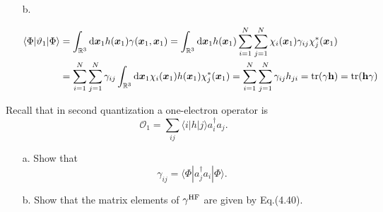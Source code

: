 \documentclass[a4paper]{book}
\newcommand\tr[1]{\mathrm{tr(#1)}}
\newcommand*{\dif}{\mathop{}\!\mathrm{d}}
\newcommand{\HF}{{\rm HF}}
\newcommand{\h}{{\bf h}}
\begin{document}
\begin{solution}
\begin{itemize}
	\item[b.] 
	
	\begin{align*}
		\langle \Phi | \vartheta_1 | \Phi \rangle &= \int_{ \mathbb{R}^3 } \dif \boldsymbol{x}_1 h( \boldsymbol{x}_1 ) \gamma( \boldsymbol{x}_1 , \boldsymbol{x}_1 ) = \int_{ \mathbb{R}^3 } \dif \boldsymbol{x}_1 h( \boldsymbol{x}_1 ) \sum_{ i=1 }^N \sum_{ j=1 }^N \chi_i( \boldsymbol{x}_1 ) \gamma_{ij} \chi^*_j( \boldsymbol{x}_1 ) \\
		&= \sum_{ i=1 }^N \sum_{ j=1 }^N \gamma_{ij} \int_{ \mathbb{R}^3 } \dif \boldsymbol{x}_1 \chi_i( \boldsymbol{x}_1 ) h( \boldsymbol{x}_1 ) \chi^*_j( \boldsymbol{x}_1 ) = \sum_{ i=1 }^N \sum_{ j=1 }^N \gamma_{ij} h_{ji} = \tr{\gamma \h} = \tr{\h \gamma} 
	\end{align*}
		
	\end{itemize}		
	
	\end{solution}
	
	\begin{exercise}
	Recall that in second quantization a one-electron operator is
	\[
		\mathscr{O}_1 = \sum_{ij} \langle i | h | j \rangle a^\dagger_i a_j.
	\]
	\begin{enumerate}
	
	\item[a.] Show that
	\[
		\gamma_{ij} = \langle \Phi | a^\dagger_j a_i | \Phi \rangle.
	\]
	
	\item[b.] Show that the matrix elements of $\gamma^{\HF}$ are given by Eq.(4.40).
	
	\end{enumerate}
	\end{exercise}
	
\end{document}
